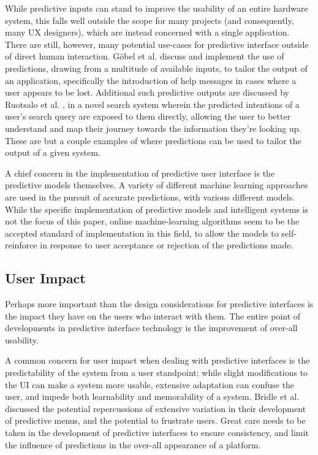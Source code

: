 \documentclass[format=acmsmall, nonacm, authorversion, screen]{acmart}
\begin{document}
While predictive inputs can stand to improve the usability of an entire hardware system, this falls well outside the scope for many projects (and consequently, many UX designers), which are instead concerned with a single application. There are still, however, many potential use-cases for predictive interface outside of direct human interaction. G\"{o}bel et al. \citep{gobel2016importance} discuss and implement the use of predictions, drawing from a multitude of available inputs, to tailor the output of an application, specifically the introduction of help messages in cases where a user appears to be lost. Additional such predictive outputs are discussed by Ruotsalo et al. \citep{ruotsalo2014intent}, in a novel search system wherein the predicted intentions of a user's search query are exposed to them directly, allowing the user to better understand and map their journey towards the information they're looking up. These are but a couple examples of where predictions can be used to tailor the output of a given system. 

A chief concern in the implementation of predictive user interface is the predictive models themselves. A variety of different machine learning approaches are used in the pursuit of accurate predictions, with various different models. While the specific implementation of predictive models and intelligent systems is not the focus of this paper, online machine-learning algorithms seem to be the accepted standard of implementation in this field, to allow the models to self-reinforce in response to user acceptance or rejection of the predictions made. 

\subsection{User Impact}%
Perhaps more important than the design considerations for predictive interfaces is the impact they have on the users who interact with them. The entire point of developments in predictive interface technology is the improvement of over-all usability.

A common concern for user impact when dealing with predictive interfaces is the predictability of the system from a user standpoint; while slight modifications to the UI can make a system more usable, extensive adaptation can confuse the user, and impede both learnability and memorability of a system. Bridle et al. \citep{bridle2005predictive} discussed the potential repercussions of extensive variation in their development of predictive menus, and the potential to frustrate users. Great care needs to be taken in the development of predictive interfaces to ensure consistency, and limit the influence of predictions in the over-all appearance of a platform. 
\end{document}
